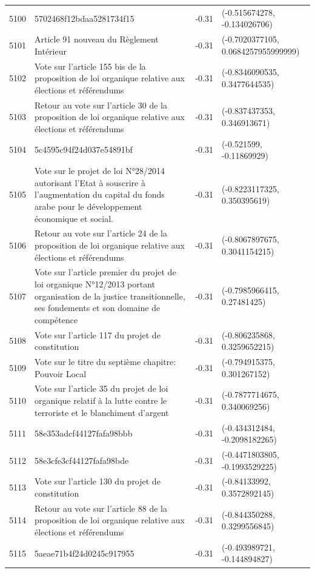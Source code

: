 \begin{table}[ht]
\begin{tabular}{rlrl}
  5100 & 5702468f12bdaa5281734f15 & -0.31 & (-0.515674278, -0.134026706) \\ 
  5101 & Article 91 nouveau du Règlement Intérieur & -0.31 & (-0.7020377105, 0.0684257955999999) \\ 
  5102 & Vote sur l'article 155 bis de la proposition de loi organique relative aux élections et référendums & -0.31 & (-0.8346090535, 0.3477644535) \\ 
  5103 & Retour au vote sur l'article 30 de la proposition de loi organique relative aux élections et référendums & -0.31 & (-0.837437353, 0.346913671) \\ 
  5104 & 5c4595c94f24d037e54891bf & -0.31 & (-0.521599, -0.11869929) \\ 
  5105 & Vote sur le projet de loi N°28/2014 autorisant l'Etat à souscrire à l'augmentation du capital du fonds arabe pour le développement économique et social. & -0.31 & (-0.8223117325, 0.350395619) \\ 
  5106 & Retour au vote sur l'article 24 de la proposition de loi organique relative aux élections et référendums & -0.31 & (-0.8067897675, 0.3041154215) \\ 
  5107 & Vote sur l'article premier du projet de loi organique N°12/2013 portant organisation de la justice transitionnelle, ses fondements et son domaine de compétence & -0.31 & (-0.7985966415, 0.27481425) \\ 
  5108 & Vote sur l'article 117 du projet de constitution & -0.31 & (-0.806235868, 0.3259652215) \\ 
  5109 & Vote sur le titre du septième chapitre: Pouvoir Local & -0.31 & (-0.794915375, 0.301267152) \\ 
  5110 & Vote sur l'article 35 du projet de loi organique relatif à la lutte contre le terroriste et le blanchiment d'argent & -0.31 & (-0.7877714675, 0.340069256) \\ 
  5111 & 58e353adcf44127fafa98bbb & -0.31 & (-0.434312484, -0.2098182265) \\ 
  5112 & 58e3cfe3cf44127fafa98bde & -0.31 & (-0.4471803805, -0.1993529225) \\ 
  5113 & Vote sur l'article 130 du projet de constitution & -0.31 & (-0.84133992, 0.3572892145) \\ 
  5114 & Retour au vote sur l'article 88 de la proposition de loi organique relative aux élections et référendums & -0.31 & (-0.844350288, 0.3299556845) \\ 
  5115 & 5aeae71b4f24d0245c917955 & -0.31 & (-0.493989721, -0.144894827) \\ 

\end{tabular}
\end{table}

